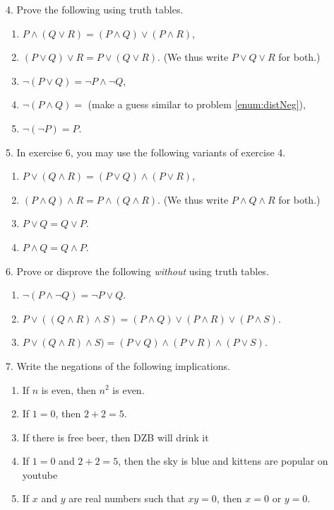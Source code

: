\documentclass[12pt, reqno]{amsart}
\begin{document}
4. Prove the following using truth tables.
\vspace{10pt}
\begin{enumerate}
\item $P \wedge(  Q\vee R) = (P\wedge Q) \vee (P \wedge R)$,
\item $(P \vee Q) \vee R = P \vee (Q \vee R)$. (We thus write $P \vee Q \vee R$ for both.)
\item \label{enum:distNeg} $\neg (P \vee Q) = \neg P \wedge \neg Q$,
\item $\neg (P \wedge Q) =$ (make a guess similar to problem \ref{enum:distNeg}),
\item $\neg (\neg P) = P$.
\end{enumerate}
\vspace{20pt}

\newpage

5. In exercise 6, you may use the following variants of exercise 4.
\vspace{10pt}
\begin{enumerate}
\item $P \vee(  Q\wedge R) = (P\vee Q) \wedge (P \vee R)$,
\item $(P \wedge Q) \wedge R = P \wedge (Q \wedge R)$. (We thus write $P \wedge Q \wedge R$ for both.)
\item $P \vee Q = Q \vee P$.
\item $P \wedge Q = Q \wedge P$.
\end{enumerate}
\vspace{20pt}

6. Prove or disprove the following \emph{without} using truth tables. 
\vspace{10pt}
\begin{enumerate}
\item $\neg(P \wedge \neg Q) = \neg P \vee Q$.
\item $P \vee ((Q \wedge R) \wedge S) = (P \wedge Q) \vee (P \wedge R)
  \vee (P \wedge S)$.
\item $P \vee (Q \wedge R) \wedge S) = (P \vee Q) \wedge (P \vee R)
  \wedge (P \vee S)$.

\end{enumerate}
\vspace{20pt}

7. Write the negations of the following implications.
\vspace{10pt}
\begin{enumerate}
\item If $n$ is even, then $n^2$ is even.
\item If $1 = 0$, then $2 + 2 = 5$.
\item If there is free beer, then DZB will drink it
\item If $1 = 0$ and $2 + 2 = 5$, then the sky is blue and kittens are popular on youtube
\item If $x$ and $y$ are real numbers such that $xy = 0$, then $x = 0$ or $y = 0$.
\end{enumerate}
\vspace{20pt}
\end{document}
